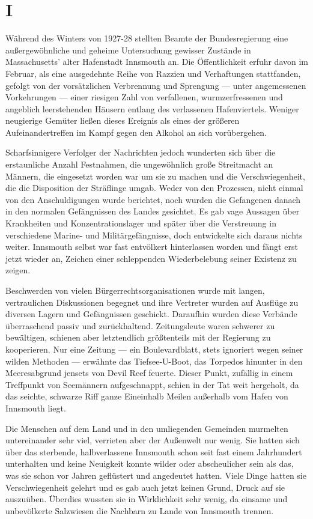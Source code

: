\chapter*{I}

Während des Winters von 1927-28 stellten Beamte der Bundesregierung eine außergewöhnliche und geheime Untersuchung gewisser Zustände in Massachusetts' alter Hafenstadt Innsmouth an. Die Öffentlichkeit erfuhr davon im Februar, als eine ausgedehnte Reihe von Razzien und Verhaftungen stattfanden, gefolgt von der vorsätzlichen Verbrennung und Sprengung --- unter angemessenen Vorkehrungen --- einer riesigen Zahl von verfallenen, wurmzerfressenen und angeblich leerstehenden Häusern entlang des verlassenen Hafenviertels. Weniger neugierige Gemüter ließen dieses Ereignis als eines der größeren Aufeinandertreffen im Kampf gegen den Alkohol an sich vorübergehen.

Scharfsinnigere Verfolger der Nachrichten jedoch wunderten sich über die erstaunliche Anzahl Festnahmen, die ungewöhnlich große Streitmacht an Männern, die eingesetzt worden war um sie zu machen und die Verschwiegenheit, die die Disposition der Sträflinge umgab. Weder von den Prozessen, nicht einmal von den Anschuldigungen wurde berichtet, noch wurden die Gefangenen danach in den normalen Gefängnissen des Landes gesichtet. Es gab vage Aussagen über Krankheiten und Konzentrationslager und später über die Verstreuung in verschiedene Marine- und Militärgefängnisse, doch entwickelte sich daraus nichts weiter. Innsmouth selbst war fast entvölkert hinterlassen worden und fängt erst jetzt wieder an, Zeichen einer schleppenden Wiederbelebung seiner Existenz zu zeigen.

Beschwerden von vielen Bürgerrechtsorganisationen wurde mit langen, vertraulichen Diskussionen begegnet und ihre Vertreter wurden auf Ausflüge zu diversen Lagern und Gefängnissen geschickt. Daraufhin wurden diese Verbände überraschend passiv und zurückhaltend. Zeitungsleute waren schwerer zu bewältigen, schienen aber letztendlich größtenteils mit der Regierung zu kooperieren. Nur eine Zeitung --- ein Boulevardblatt, stets ignoriert wegen seiner wilden Methoden --- erwähnte das Tiefsee-U-Boot, das Torpedos hinunter in den Meeresabgrund jensets von Devil Reef feuerte. Dieser Punkt, zufällig in einem Treffpunkt von Seemännern aufgeschnappt, schien in der Tat weit hergeholt, da das seichte, schwarze Riff ganze Eineinhalb Meilen außerhalb vom Hafen von Innsmouth liegt.

Die Menschen auf dem Land und in den umliegenden Gemeinden murmelten untereinander sehr viel, verrieten aber der Außenwelt nur wenig. Sie hatten sich über das sterbende, halbverlassene Innsmouth schon seit fast einem Jahrhundert unterhalten und keine Neuigkeit konnte wilder oder abscheulicher sein als das, was sie schon vor Jahren geflüstert und angedeutet hatten.
Viele Dinge hatten sie Verschwiegenheit gelehrt und es gab auch jetzt keinen Grund, Druck auf sie auszuüben. Überdies wussten sie in Wirklichkeit sehr wenig, da einsame und unbevölkerte Salzwiesen die Nachbarn zu Lande von Innsmouth trennen.

